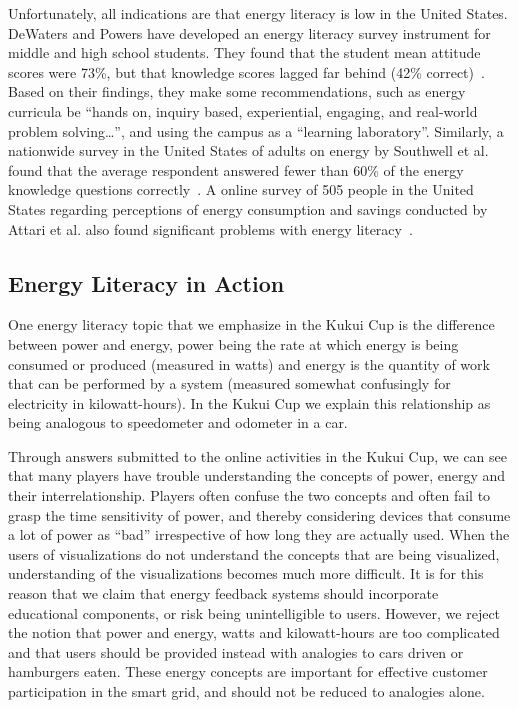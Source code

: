 \documentclass[10pt, conference, compsocconf]{IEEEtran-old}
\begin{document}
Unfortunately, all indications are that energy literacy is low in the United States. DeWaters and Powers have developed an energy literacy survey instrument for middle and high school students. They found that the student mean attitude scores were 73\%, but that knowledge scores lagged far behind (42\% correct)~\cite{DeWaters2011}. Based on their findings, they make some recommendations, such as energy curricula be ``hands on, inquiry based, experiential, engaging, and real-world problem solving\ldots'', and using the campus as a ``learning laboratory''. Similarly, a nationwide survey in the United States of adults on energy by Southwell et al. found that the average respondent answered fewer than 60\% of the energy knowledge questions correctly~\cite{Southwell2012}. A online survey of 505 people in the United States regarding perceptions of energy consumption and savings conducted by Attari et al. also found significant problems with energy literacy~\cite{Attari2010}.

\subsection{Energy Literacy in Action}

One energy literacy topic that we emphasize in the Kukui Cup is the difference between power and energy, power being the rate at which energy is being consumed or produced (measured in watts) and energy is the quantity of work that can be performed by a system (measured somewhat confusingly for electricity in kilowatt-hours). In the Kukui Cup we explain this relationship as being analogous to speedometer and odometer in a car.

Through answers submitted to the online activities in the Kukui Cup, we can see that many players have trouble understanding the concepts of power, energy and their interrelationship. Players often confuse the two concepts and often fail to grasp the time sensitivity of power, and thereby considering devices that consume a lot of power as ``bad'' irrespective of how long they are actually used. When the users of visualizations do not understand the concepts that are being visualized, understanding of the visualizations becomes much more difficult. It is for this reason that we claim that energy feedback systems should incorporate educational components, or risk being unintelligible to users. However, we reject the notion that power and energy, watts and kilowatt-hours are too complicated and that users should be provided instead with analogies to cars driven or hamburgers eaten. These energy concepts are important for effective customer participation in the smart grid, and should not be reduced to analogies alone.
\end{document}

